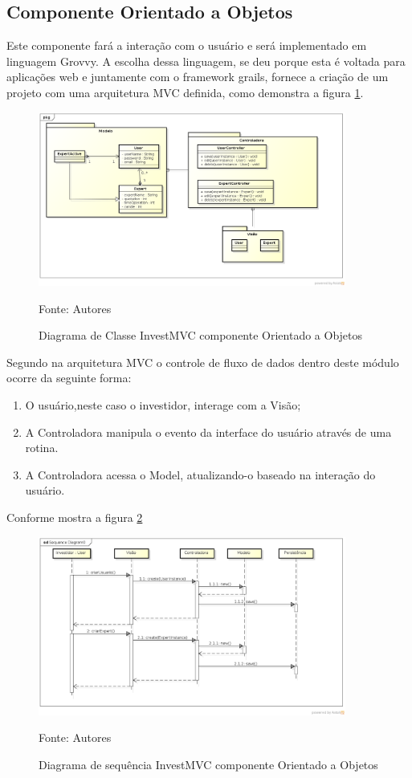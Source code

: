 \subsection{Componente Orientado a Objetos}

Este componente fará a interação com o usuário e será implementado em linguagem Grovvy. A escolha dessa linguagem, se deu porque esta é voltada para aplicações web e juntamente com  o framework grails, fornece a criação de um projeto com uma arquitetura MVC definida, como demonstra a figura \ref{classeOO}.

\begin{figure}[htp]
\centering
\includegraphics[width=0.9\textwidth]{figuras/classeOO}
\caption{Diagrama de Classe InvestMVC componente Orientado a Objetos}{Fonte: Autores} 
\label{classeOO}
\end{figure}

Segundo  na arquitetura MVC o controle de fluxo de dados dentro deste módulo ocorre da seguinte forma:

\begin{enumerate}
\item O usuário,neste caso o investidor, interage com a Visão;
\item A Controladora manipula o evento da interface do usuário através de uma rotina.
\item A Controladora acessa o Model, atualizando-o baseado na interação do usuário.
\end{enumerate}

Conforme mostra a figura \ref{sequenciaOO}

\begin{figure}[htp]
\centering
\includegraphics[width=0.9\textwidth]{figuras/sequenciaOO}
\caption{Diagrama de sequência InvestMVC componente Orientado a Objetos}{Fonte: Autores}
\label{sequenciaOO}
\end{figure}

